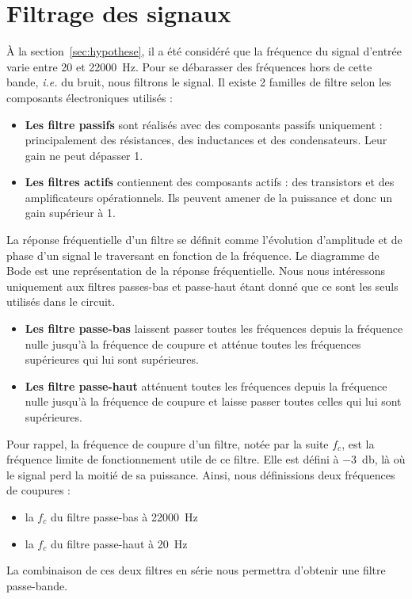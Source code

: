 \documentclass[10pt, oneside, a4paper]{article}
\begin{document}
\section{Filtrage des signaux}
À la section~\ref{sec:hypothese}, il a été considéré que la fréquence du signal d'entrée varie entre \num{20} et \SI{22000}{\hertz}.
Pour se débarasser des fréquences hors de cette bande, \textit{i.e.} du bruit, nous filtrons le signal.
Il existe 2 familles de filtre selon les composants électroniques utilisés :
\begin{itemize}
    \item\textbf{Les filtre passifs} sont réalisés avec des composants passifs uniquement : principalement des résistances, des inductances et des condensateurs.
        Leur gain ne peut dépasser 1.
    \item\textbf{Les filtres actifs} contiennent des composants actifs : des transistors et des amplificateurs opérationnels.
        Ils peuvent amener de la puissance et donc un gain supérieur à 1.
\end{itemize}
La réponse fréquentielle d'un filtre se définit comme l'évolution d'amplitude et de phase d'un signal le traversant en fonction de la fréquence.
Le diagramme de Bode est une représentation de la réponse fréquentielle.
Nous nous intéressons uniquement aux filtres passes-bas et passe-haut étant donné que ce sont les seuls utilisés dans le circuit.
\begin{itemize}
    \item\textbf{Les filtre passe-bas} laissent passer toutes les fréquences depuis
        la fréquence nulle jusqu'à la fréquence de coupure et atténue toutes les
        fréquences supérieures qui lui sont supérieures.
    \item\textbf{Les filtre passe-haut} atténuent toutes les fréquences depuis la
        fréquence nulle jusqu'à la fréquence de coupure et laisse passer toutes
        celles qui lui sont supérieures.
\end{itemize}
Pour rappel, la fréquence de coupure d'un filtre, notée par la suite $f_c$, est la fréquence limite de fonctionnement utile de ce filtre.
Elle est défini à \SI{-3}{\decibel}, là où le signal perd la moitié de sa puissance.
Ainsi, nous définissions deux fréquences de coupures :
\begin{itemize}
    \item la $f_c$ du filtre passe-bas à \SI{22000}{\hertz}
    \item la $f_c$ du filtre passe-haut à \SI{20}{\hertz}
\end{itemize}
La combinaison de ces deux filtres en série nous permettra d'obtenir une filtre passe-bande.
\end{document}
